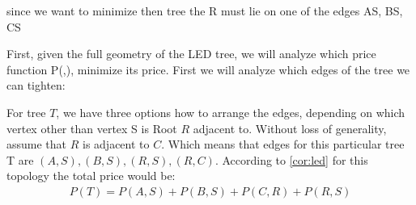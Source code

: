 \documentclass[12pt]{article}
\newcommand{\Price}[2]{P(#1,#2)}
\newcommand{\Ptotal}[1]{P(#1)}
\begin{document}
	since we want to minimize then tree the R must lie on one of the edges AS, BS, CS 
	
	
	
	
	
	First, given the full geometry of the LED tree, we will analyze which price function \Price{}{}, minimize its price.
	First we will analyze which edges of the tree we can tighten:
	
	For tree \( T \), we have three options how to arrange the edges, depending on which vertex other than vertex S is Root \( R \) adjacent to. Without loss of generality, assume that \(R\) is adjacent to \(C\). Which means that edges for this particular tree T are \((A,S),(B,S),(R,S),(R,C)\). According to  \cref{cor:led} for this topology the total price would be:
	 \begin{align*}
	 	\Ptotal{T} = \Price{A}{S} + \Price{B}{S} + \Price{C}{R} + \Price{R}{S}
	 \end{align*}
	 
\end{document}
